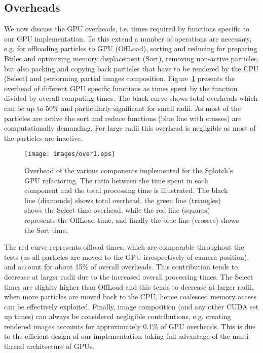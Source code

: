 \documentclass[1p]{elsarticle}
\begin{document}
\subsection{Overheads}
\label{sec:overhead}
We now discuss the GPU overheads, i.e. times required by functions specific to our GPU implementation. To this extend a number of operations are necessary, e.g. for offloading particles to GPU (OffLoad), sorting and reducing for preparing Btiles and optimizing memory displacement (Sort), removing non-active particles, but also packing and copying back particles that have to be rendered by the CPU (Select) and performing partial images composition. Figure~\ref{fig:over} presents the overhead of different GPU specific functions as times spent by the function divided by overall computing times. The black curve shows total overheads which can be up to 50\% and particularly significant for small radii. As most of the particles are active the sort and reduce 
functions (blue line with crosses) are computationally demanding. For large radii this overhead is negligible as most of the particles are inactive. 

\begin{figure}
\centering
\texttt{[image: images/over1.eps]}
\caption{Overhead of the various components implemented for the Splotch's
GPU refactoring. The ratio between the time spent in each component and the total processing 
time is illustrated. The black line (diamonds) shows total overhead, the green line (triangles) shows the Select time overhead, while the red line (squares) represents the OffLoad time, and finally the blue line (crosses) shows the Sort time.}
\label{fig:over}
\end{figure}

The red curve represents offload times, which are comparable throughout the tests (as all particles are moved to the GPU irrespectively of camera position), and account for about 15\% of overall overheads. This contribution tends to decrease at larger radii due to the increased overall processing times. The Select times are slighlty higher than OffLoad and this tends to decrease at larger radii, when more particles are moved back to the CPU, hence coalesced memory access can be effectively exploited. Finally, image composition (and any other CUDA set up times) can always be considered negligible contributions, e.g. creating rendered images accounts for approximately 0.1\% of GPU overheads. This is due to the efficient design of our implementation taking full advantage of the multi-thread architecture of GPUs.
\end{document}
